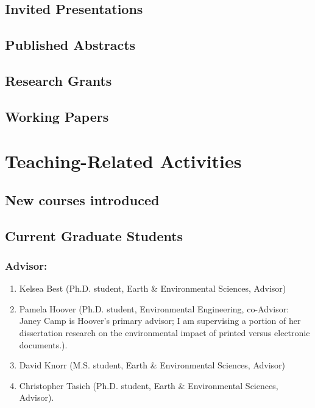 \documentclass[10pt]{article}
\begin{document}
	\subsection{Invited Presentations}
	
	\subsection{Published Abstracts}
	
	\subsection{Research Grants}
	
%	
%
\iftrue
	\subsection{Working Papers} %
	
\fi

\section{Teaching-Related Activities}
	\subsection{New courses introduced}
	
	\subsection{Current Graduate Students}
    \subsubsection{Advisor:}
	\begin{enumerate}
    \item Kelsea Best (Ph.D. student, Earth \& Environmental Sciences, Advisor)
    \item Pamela Hoover (Ph.D. student, Environmental Engineering, co-Advisor: Janey Camp is Hoover's primary advisor; I am supervising a portion of her dissertation research on the environmental impact of printed versus electronic documents.).
    \item David Knorr (M.S. student, Earth \& Environmental Sciences, Advisor)
    \item Christopher Tasich (Ph.D. student, Earth \& Environmental Sciences, Advisor).
    \end{enumerate}
\end{document}
